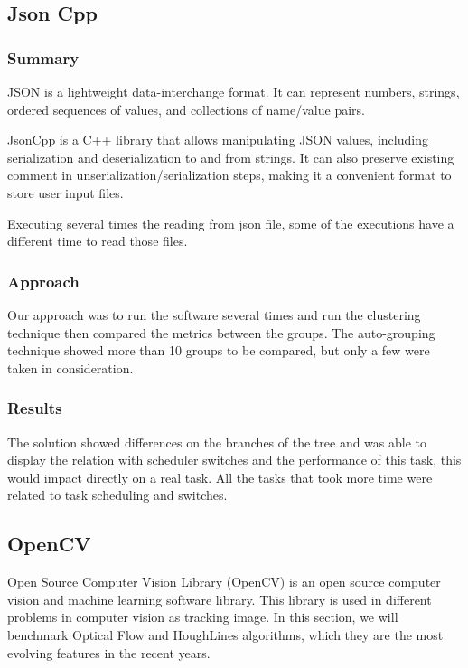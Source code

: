     
    
\subsection{\textbf{Json Cpp}}
\subsubsection{Summary}
    JSON is a lightweight data-interchange format. It can represent numbers, strings, ordered sequences of values, and collections of name/value pairs.

    JsonCpp is a C++ library that allows manipulating JSON values, including serialization and deserialization to and from strings. It can also preserve existing comment in unserialization/serialization steps, making it a convenient format to store user input files.
    
    Executing several times the reading from json file, some of the executions have a different time to read those files.    
    
\subsubsection{Approach}
    Our approach was to run the software several times and run the clustering technique then compared the metrics between the groups.
    The auto-grouping technique showed more than 10 groups to be compared, but only a few were taken in consideration.
    
\subsubsection{Results}
    The solution showed differences on the branches of the tree and was able to display the relation with scheduler switches and the performance of this task, this would impact directly on a real task. All the tasks that took more time were related to task scheduling and switches.
    
    
\subsection{\textbf{OpenCV}}
Open Source Computer Vision Library (OpenCV) is an open source computer vision and machine learning software library. This library is used in different problems in computer vision as tracking image. In this section, we will benchmark Optical Flow and HoughLines algorithms, which they are the most evolving features in the recent years.

